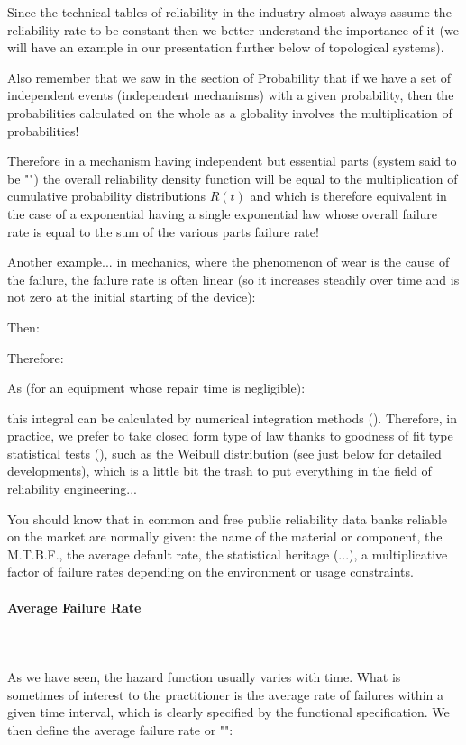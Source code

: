 	Since the technical tables of reliability in the industry almost always assume the reliability rate to be constant then we better understand the importance of it (we will have an example in our presentation further below of topological systems).
	
	Also remember that we saw in the section of Probability that if we have a set of independent events (independent mechanisms) with a given probability, then the probabilities calculated on the whole as a globality involves the multiplication of probabilities!
	
	Therefore in a mechanism having independent but essential parts (system said to be "") the overall reliability density function will be equal to the multiplication of cumulative probability distributions $R (t)$ and which is therefore equivalent in the case of a exponential having a single exponential law whose overall failure rate is equal to the sum of the various parts failure rate!
	
	Another example... in mechanics, where the phenomenon of wear is the cause of the failure, the failure rate is often linear (so it increases steadily over time and is not zero at the initial starting of the device):
	
	Then:
	
	Therefore:
	
	As (for an equipment whose repair time is negligible):
	
	this integral can be calculated by numerical integration methods (). Therefore, in practice, we prefer to take closed form type of law thanks to goodness of fit type statistical tests (), such as the Weibull distribution (see just below for detailed developments), which is a little bit the trash to put everything in the field of reliability engineering...
	
	You should know that in common and free public reliability data banks reliable on the market are normally given: the name of the material or component, the M.T.B.F., the average default rate, the statistical heritage (...), a multiplicative factor of failure rates depending on the environment or usage constraints. 
	
	\pagebreak
	\paragraph{Average Failure Rate}\mbox{}\\\\
	As we have seen, the hazard function usually varies with time. What is sometimes of interest to the practitioner is the average rate of failures within a given time interval, which is clearly specified by the functional specification. We then define the average failure rate or "":
	
